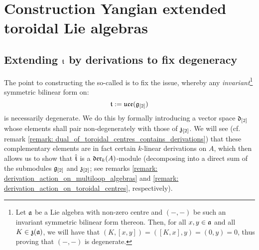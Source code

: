 \section{Construction Yangian extended toroidal Lie algebras}
    \subsection{Extending \texorpdfstring{$\mathfrak{t}$}{} by derivations to fix degeneracy}
        The point to constructing the so-called  is to fix the issue, whereby any \textit{invariant}\footnote{Let $\mathfrak{a}$ be a Lie algebra with non-zero centre and $(-, -)$ be such an invariant symmetric bilinear form thereon. Then, for all $x, y \in \mathfrak{a}$ and all $K \in \mathfrak{z}(\mathfrak{a})$, we will have that $(K, [x, y]) = ([K, x], y) = (0, y) = 0$, thus proving that $(-, -)$ is degenerate.} symmetric bilinear form on:
            $$\mathfrak{t}:= \mathfrak{uce}(\mathfrak{g}_{[2]})$$
        is necessarily degenerate. We do this by formally introducing a  vector space $\mathfrak{d}_{[2]}$ whose elements shall pair non-degenerately with those of $\mathfrak{z}_{[2]}$. We will see (cf. remark \ref{remark: dual_of_toroidal_centres_contains_derivations}) that these complementary elements are in fact certain $k$-linear derivations on $A$, which then allows us to show that $\hat{\mathfrak{t}}$ is a $\mathfrak{der}_k(A)$-module (decomposing into a direct sum of the submodules $\mathfrak{g}_{[2]}$ and $\mathfrak{z}_{[2]}$; see remarks \ref{remark: derivation_action_on_multiloop_algebras} and \ref{remark: derivation_action_on_toroidal_centres}, respectively).
        
